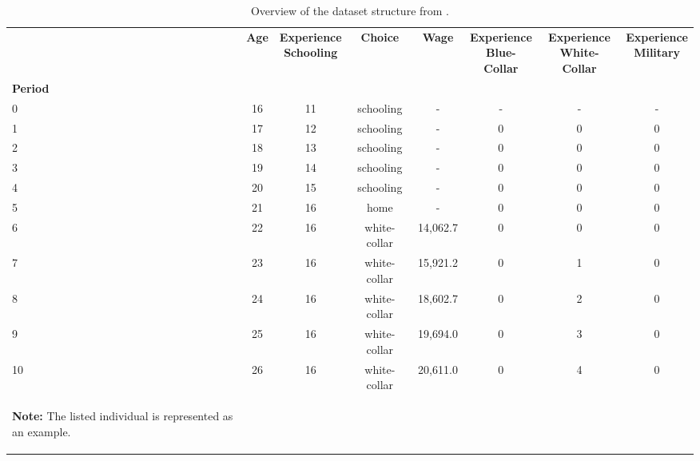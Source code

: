 \begin{ThreePartTable}

	\begin{longtable}{@{}lccccccc@{}}
		\caption{Overview of the dataset structure from \citet{Keane.1997}.}
		\label{tab:BasicDataStructure}
		
		\setlength\extrarowheight{2.5pt}
		
		\\
		\toprule
       & \textbf{Age}    & \thead{\textbf{Experience}\\ \textbf{Schooling}}  & \textbf{Choice} & \textbf{Wage} & \thead{\textbf{Experience}\\ \textbf{Blue-Collar}} & \thead{\textbf{Experience}\\ \textbf{White-Collar}} & \thead{\textbf{Experience}\\ \textbf{Military}}   \\
\textbf{Period} &        &            &        &      &             &               &       \\ \midrule
		\endfirsthead
		
0  & 16 & 11 & schooling    & - & - & - & -\\
1  & 17 & 12 & schooling    & - & 0 & 0 & 0\\
2  & 18 & 13 & schooling    & - & 0 & 0 & 0\\
3  & 19 & 14 & schooling    & - & 0 & 0 & 0\\
4  & 20 & 15 & schooling    & - & 0 & 0 & 0\\
5  & 21 & 16 & home         & - & 0 & 0 & 0\\
6  & 22 & 16 & white-collar & 14,062.7 & 0 & 0 & 0\\
7  & 23 & 16 & white-collar & 15,921.2 & 0 & 1 & 0\\
8  & 24 & 16 & white-collar & 18,602.7 & 0 & 2 & 0\\
9  & 25 & 16 & white-collar & 19,694.0 & 0 & 3 & 0\\
10 & 26 & 16 & white-collar & 20,611.0 & 0 & 4 & 0\\
  \bottomrule
	\begin{TableNotes}
		\item \textbf{Note:} The listed individual is represented as an example. 
	\end{TableNotes}		
	\end{longtable}
\end{ThreePartTable}